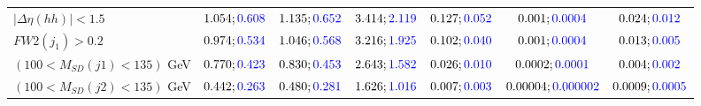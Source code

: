 \begin{landscape}
\begin{table}
\begin{tabular}{lcccccc}
				\rowcolor{black!7}$|\Delta\eta(hh)|<1.5$& $1.054;\textcolor{blue}{0.608}$&$1.135;\textcolor{blue}{0.652}$ &$3.414;\textcolor{blue}{2.119}$ &$0.127;\textcolor{blue}{0.052}$ &$0.001;\textcolor{blue}{0.0004}$ &$0.024;\textcolor{blue}{0.012}$\\
				$FW2(j_1)>0.2$ &$0.974;\textcolor{blue}{0.534}$ &$1.046;\textcolor{blue}{0.568}$&$3.216;\textcolor{blue}{1.925}$&$0.102;\textcolor{blue}{0.040}$&$0.001;\textcolor{blue}{0.0004}$&$0.013;\textcolor{blue}{0.005}$\\
				\rowcolor{black!7}$(100<M_{SD}(j1)<135)$ GeV& $0.770;\textcolor{blue}{0.423}$&$0.830;\textcolor{blue}{0.453}$&$2.643;\textcolor{blue}{1.582}$&$0.026;\textcolor{blue}{0.010}$&$0.0002;\textcolor{blue}{0.0001}$&$0.004;\textcolor{blue}{0.002}$\\
				$(100<M_{SD}(j2)<135)$ GeV &$0.442;\textcolor{blue}{0.263}$ &$0.480;\textcolor{blue}{0.281}$ &$1.626;\textcolor{blue}{1.016}$&$0.007;\textcolor{blue}{0.003}$&$0.00004;\textcolor{blue}{0.000002}$&$0.0009;\textcolor{blue}{0.0005}$\\
				\bottomrule
			\end{tabular}
		\end{table}
		

\end{landscape}
